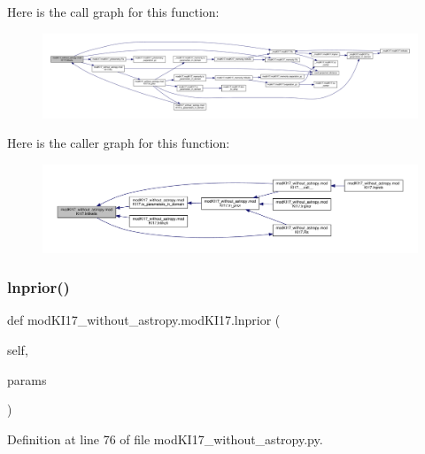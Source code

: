 Here is the call graph for this function\+:\nopagebreak
\begin{figure}[H]
\begin{center}
\leavevmode
\includegraphics[width=350pt]{d3/df4/classmodKI17__without__astropy_1_1modKI17_ab936b4548a8cece5971ccd63db9bccc5_cgraph}
\end{center}
\end{figure}
Here is the caller graph for this function\+:\nopagebreak
\begin{figure}[H]
\begin{center}
\leavevmode
\includegraphics[width=350pt]{d3/df4/classmodKI17__without__astropy_1_1modKI17_ab936b4548a8cece5971ccd63db9bccc5_icgraph}
\end{center}
\end{figure}
\mbox{\label{classmodKI17__without__astropy_1_1modKI17_abd872f61c836ff783aa00f80a94674b2}} 
\subsubsection{\texorpdfstring{lnprior()}{lnprior()}}
{\footnotesize\ttfamily def mod\+K\+I17\+\_\+without\+\_\+astropy.\+mod\+K\+I17.\+lnprior (\begin{DoxyParamCaption}\item[{}]{self,  }\item[{}]{params }\end{DoxyParamCaption})}



Definition at line 76 of file mod\+K\+I17\+\_\+without\+\_\+astropy.\+py.


